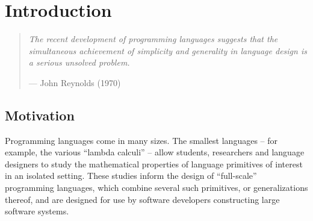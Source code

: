 \chapter{Introduction}\label{chap:intro}
\vspace{-5px}
\begin{quote}\textit{The recent development of programming languages suggests that the simul\-taneous achievement of simplicity 
and generality in language design is a serious unsolved 
problem.}\begin{flushright}--- John Reynolds (1970) \cite{Reynolds70}\end{flushright}
\end{quote}
\vspace{-5px}
\section{Motivation}\label{sec:intro-motivation}


Programming languages come in many sizes. The smallest languages -- for example, the various ``lambda calculi'' -- allow students, researchers and language designers to study the mathematical properties of language primitives of interest in an isolated setting. These studies inform the design of ``full-scale'' programming 
 languages, which combine several such primitives, or generalizations thereof, and are designed for use by software developers constructing large software systems.

